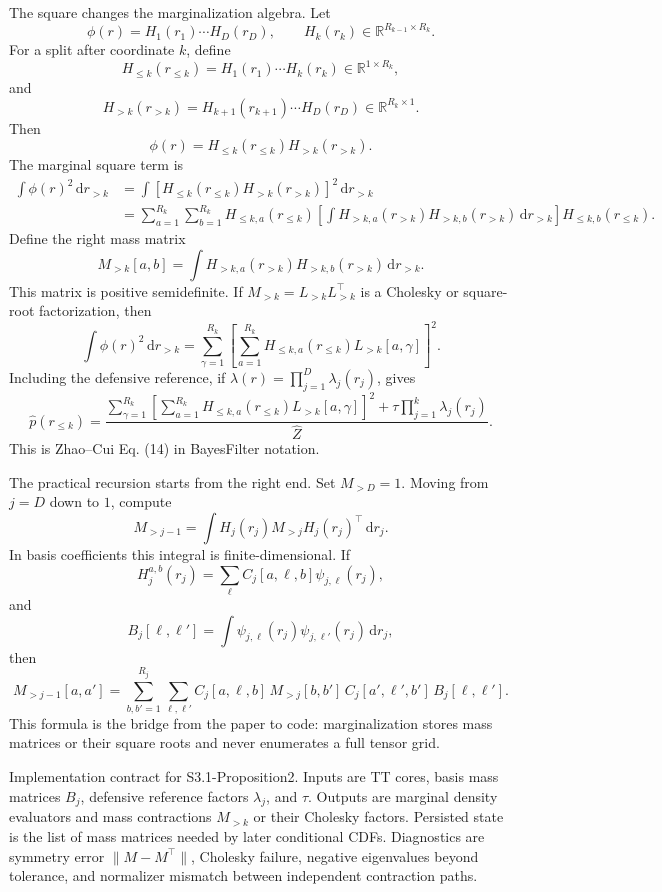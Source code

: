 \documentclass[11pt]{article}
\newcommand{\R}{\mathbb R}
\newcommand{\dd}{\,\mathrm d}
\begin{document}
The square changes the marginalization algebra.  Let
\[
    \phi(r)=H_1(r_1)\cdots H_D(r_D),
    \qquad H_k(r_k)\in\R^{R_{k-1}\times R_k}.
\]
For a split after coordinate \(k\), define
\[
    H_{\le k}(r_{\le k})=H_1(r_1)\cdots H_k(r_k)\in\R^{1\times R_k},
\]
and
\[
    H_{>k}(r_{>k})=H_{k+1}(r_{k+1})\cdots H_D(r_D)\in\R^{R_k\times 1}.
\]
Then
\[
    \phi(r)=H_{\le k}(r_{\le k})H_{>k}(r_{>k}).
\]
The marginal square term is
\[
\begin{aligned}
 \int \phi(r)^2\dd r_{>k}
 &=
 \int
 \left[
 H_{\le k}(r_{\le k})H_{>k}(r_{>k})
 \right]^2\dd r_{>k}\\
 &=
 \sum_{a=1}^{R_k}\sum_{b=1}^{R_k}
 H_{\le k,a}(r_{\le k})
 \left[
 \int H_{>k,a}(r_{>k})H_{>k,b}(r_{>k})\dd r_{>k}
 \right]
 H_{\le k,b}(r_{\le k}).
\end{aligned}
\tag{M1}
\]
Define the right mass matrix
\[
    M_{>k}[a,b]
    =
    \int H_{>k,a}(r_{>k})H_{>k,b}(r_{>k})\dd r_{>k}.
    \tag{M2}
\]
This matrix is positive semidefinite.  If \(M_{>k}=L_{>k}L_{>k}^\top\) is a
Cholesky or square-root factorization, then
\[
    \int \phi(r)^2\dd r_{>k}
    =
    \sum_{\gamma=1}^{R_k}
    \left[
    \sum_{a=1}^{R_k}H_{\le k,a}(r_{\le k})L_{>k}[a,\gamma]
    \right]^2.
    \tag{M3}
\]
Including the defensive reference, if
\(\lambda(r)=\prod_{j=1}^D\lambda_j(r_j)\), gives
\[
    \widehat p(r_{\le k})
    =
    \frac{
    \sum_{\gamma=1}^{R_k}
    \left[
    \sum_{a=1}^{R_k}H_{\le k,a}(r_{\le k})L_{>k}[a,\gamma]
    \right]^2
    +
    \tau\prod_{j=1}^k\lambda_j(r_j)}
    {\widehat Z}.
    \tag{M4}
\]
This is Zhao--Cui Eq. (14) in BayesFilter notation.

The practical recursion starts from the right end.  Set \(M_{>D}=1\).  Moving
from \(j=D\) down to \(1\), compute
\[
    M_{>j-1}
    =
    \int H_j(r_j)M_{>j}H_j(r_j)^\top\dd r_j.
    \tag{M5}
\]
In basis coefficients this integral is finite-dimensional.  If
\[
    H_j^{a,b}(r_j)=\sum_{\ell}C_j[a,\ell,b]\psi_{j,\ell}(r_j),
\]
and
\[
    B_j[\ell,\ell']
    =
    \int \psi_{j,\ell}(r_j)\psi_{j,\ell'}(r_j)\dd r_j,
\]
then
\[
    M_{>j-1}[a,a']
    =
    \sum_{b,b'=1}^{R_j}
    \sum_{\ell,\ell'}
    C_j[a,\ell,b]\,M_{>j}[b,b']\,C_j[a',\ell',b']\,B_j[\ell,\ell'].
    \tag{M6}
\]
This formula is the bridge from the paper to code: marginalization stores mass
matrices or their square roots and never enumerates a full tensor grid.

Implementation contract for S3.1-Proposition2.  Inputs are TT cores, basis mass
matrices \(B_j\), defensive reference factors \(\lambda_j\), and \(\tau\).
Outputs are marginal density evaluators and mass contractions \(M_{>k}\) or
their Cholesky factors.  Persisted state is the list of mass matrices needed by
later conditional CDFs.  Diagnostics are symmetry error
\(\|M-M^\top\|\), Cholesky failure, negative eigenvalues beyond tolerance, and
normalizer mismatch between independent contraction paths.
\end{document}
